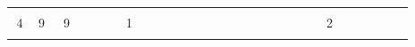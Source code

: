 \documentclass[12pt]{article}
\begin{document}
\begin{table}[]
{\begin{tabular}{clllllllllllllllllllllllllllllll}
\multicolumn{2}{|c|}{\cellcolor[HTML]{96FFFB}}                    & \multicolumn{2}{l|}{\cellcolor[HTML]{FFCC67}}                    & \multicolumn{5}{l|}{\cellcolor[HTML]{FFCC67}}                                                                         & \multicolumn{16}{l|}{\cellcolor[HTML]{9698ED}}                                                                                                                                                                                                                                                                                                                                                & \multicolumn{7}{l|}{\cellcolor[HTML]{67FD9A}}                                                                                                                          \\
\multicolumn{2}{|c|}{\multirow{-5}{*}{\cellcolor[HTML]{96FFFB}4}} & \multicolumn{2}{l|}{\multirow{-2}{*}{\cellcolor[HTML]{FFCC67}9}} & \multicolumn{5}{l|}{\multirow{-5}{*}{\cellcolor[HTML]{FFCC67}9}}                                                      & \multicolumn{16}{l|}{\multirow{-4}{*}{\cellcolor[HTML]{9698ED}1}}                                                                                                                                                                                                                                                                                                                             & \multicolumn{7}{l|}{\multirow{-6}{*}{\cellcolor[HTML]{67FD9A}2}}                                                                                                       \\ \hline
                                            &                     &                                 &                                &                       &                       &                       &                       &                       &                       &                       &                       &                       &                       &                       &                       &                       &                       &                       &                       &                       &                       &                       &                       &                       &                       &                                  &             &                       &                       &                       &                       \\

\end{tabular}}
\end{table}
\end{document}
